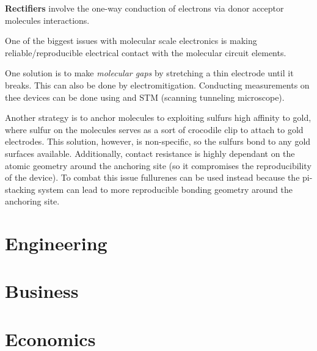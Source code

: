 \documentclass{article}
\newcounter{subsubsubsection}[subsubsection]
\begin{document}
\textbf{Rectifiers} involve the one-way conduction of electrons via donor acceptor molecules interactions.



One of the biggest issues with molecular scale electronics is making reliable/reproducible electrical contact with the molecular circuit elements. 

One solution is to make \textit{molecular gaps} by stretching a thin electrode until it breaks. This can also be done by electromitigation. Conducting measurements on thee devices can be done using and STM (scanning tunneling microscope). 

Another strategy is to anchor molecules to exploiting sulfurs high affinity to gold, where sulfur on the molecules serves as a sort of crocodile clip to attach to gold electrodes. This solution, however, is non-specific, so the sulfurs bond to any gold surfaces available. Additionally, contact resistance is highly dependant on the atomic geometry around the anchoring site (so it compromises the reproducibility of the device). To combat this issue fullurenes can be used instead because the pi-stacking system can lead to more reproducible bonding geometry around the anchoring site. 

\newpage




\section{Engineering}

\newpage














\section{Business}

\newpage












\section{Economics}
\end{document}
